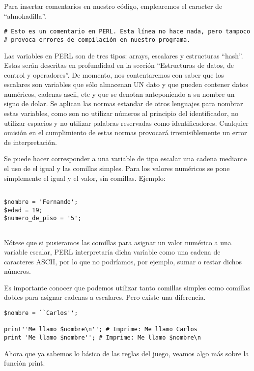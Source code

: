 Para insertar comentarios en nuestro código, emplearemos el caracter de ``almohadilla''.

\begin{verbatim}
# Esto es un comentario en PERL. Esta línea no hace nada, pero tampoco
# provoca errores de compilación en nuestro programa.
\end{verbatim}

Las variables en PERL son de tres tipos: arrays, escalares y estructuras ``hash''. Estas serán descritas en profundidad en la sección ``Estructuras de datos, de control y operadores''. De momento, nos contentaremos con saber que los escalares son variables que sólo almacenan UN dato y que pueden contener datos numéricos, cadenas ascii, etc y que se denotan anteponiendo a su nombre un signo de dolar. Se aplican las normas estandar de otros lenguajes para nombrar estas variables, como son no utilizar números al principio del identificador, no utilizar espacios y no utilizar palabras reservadas como identificadores.
Cualquier omisión en el cumplimiento de estas normas provocará irremisiblemente un error de interpretación.


Se puede hacer corresponder a una variable de tipo escalar una cadena mediante el uso de el igual y las comillas simples. Para los valores numéricos se pone símplemente el igual y el valor, sin comillas. Ejemplo:

\begin{verbatim}

$nombre = 'Fernando';
$edad = 19;
$numero_de_piso = '5';


\end{verbatim}

Nótese que si pusieramos las comillas para asignar un valor numérico a una variable escalar, PERL interpretaría dicha variable como una cadena de caracteres ASCII, por lo que no podríamos, por ejemplo, sumar o restar dichos números.

Es importante conocer que podemos utilizar tanto comillas simples como comillas dobles para asignar cadenas a escalares. Pero existe una diferencia.

\begin{verbatim}
$nombre = ``Carlos'';

print''Me llamo $nombre\n''; # Imprime: Me llamo Carlos
print 'Me llamo $nombre''; # Imprime: Me llamo $nombre\n

\end{verbatim}


Ahora que ya sabemos lo básico de las reglas del juego, veamos algo más sobre la función print.





